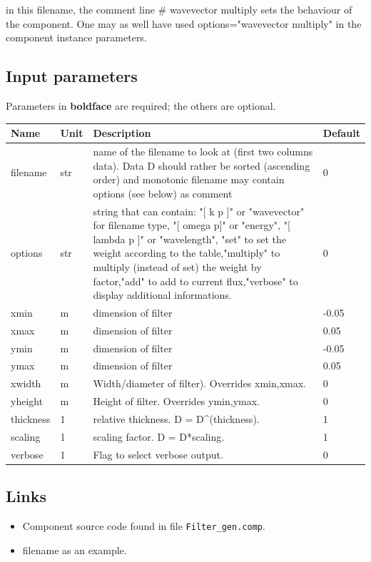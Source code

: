 in this filename, the comment line \# wavevector multiply sets the behaviour of the component. One may as well have used options="wavevector multiply" in the component instance parameters.

\subsection*{Input parameters}
Parameters in \textbf{boldface} are required; the others are optional.

\begin{longtable}{p{}p{}p{}p{}}
\toprule
\textbf{Name} & \textbf{Unit} & \textbf{Description} & \textbf{Default} \\
\midrule
\endhead
filename & str & name of the filename to look at (first two columns data). Data D should rather be sorted (ascending order) and monotonic filename may contain options (see below) as comment & 0 \\
options & str & string that can contain: "[ k p ]"      or "wavevector" for filename type, "[ omega p]"   or "energy", "[ lambda p ]" or "wavelength", "set"          to set the weight according to the table,"multiply"     to multiply (instead of set) the weight by factor,"add"          to add to current flux,"verbose"      to display additional informations. & 0 \\
xmin & m & dimension of filter & -0.05 \\
xmax & m & dimension of filter & 0.05 \\
ymin & m & dimension of filter & -0.05 \\
ymax & m & dimension of filter & 0.05 \\
xwidth & m & Width/diameter of filter). Overrides xmin,xmax. & 0 \\
yheight & m & Height of filter. Overrides ymin,ymax. & 0 \\
thickness & 1 & relative thickness. D = D\textasciicircum{}(thickness). & 1 \\
scaling & 1 & scaling factor. D = D*scaling. & 1 \\
verbose & 1 & Flag to select verbose output. & 0 \\
\bottomrule
\end{longtable}

\subsection*{Links}
\begin{itemize}
  \item Component source code found in file \texttt{Filter\_gen.comp}.
  \item {} filename as an example.
\end{itemize}

